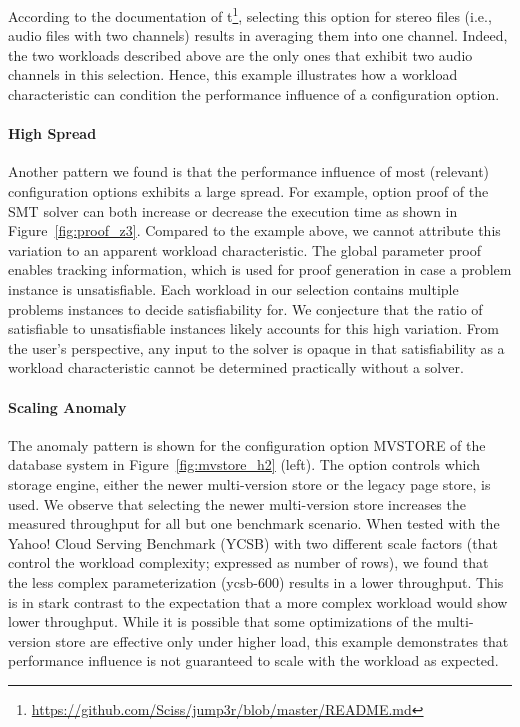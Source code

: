 {{{According to the documentation of t\jumper\footnote{\url{https://github.com/Sciss/jump3r/blob/master/README.md}}, selecting this option for stereo files (i.e., audio files with two channels) results in averaging them into one channel. Indeed, the two workloads described above are the only ones that exhibit two audio channels in this selection. Hence, this example illustrates how a workload  characteristic can condition the performance influence of a configuration option. 

\paragraph{High Spread} Another pattern we found is that the performance influence of most (relevant) configuration options exhibits a large spread. For example, option \textsf{proof} of the SMT solver \zdrei can both increase or decrease the execution time as shown in Figure~\ref{fig:proof_z3}. Compared to the example above, we cannot attribute this variation to an apparent workload characteristic.
The global parameter \textsf{proof} enables tracking information, which is used for proof generation in case a problem instance is unsatisfiable. Each workload in our selection contains multiple problems instances to decide satisfiability for. We conjecture that the ratio of satisfiable to unsatisfiable instances likely accounts for this high variation. From the user's perspective, any input to the solver is opaque in that satisfiability as a workload characteristic cannot be determined practically without a solver. 

\paragraph{Scaling Anomaly} The anomaly pattern is shown for the configuration option \textsf{MVSTORE} of the database system \htwo in Figure~\ref{fig:mvstore_h2} (left). The option controls which storage engine, either the newer multi-version store or the legacy page store, is used. We observe that selecting the newer multi-version store increases the measured throughput for all but one benchmark scenario. When tested with the Yahoo! Cloud Serving Benchmark (YCSB) with two different scale factors (that control the workload complexity; expressed as number of rows), we found that the less complex parameterization (ycsb-600) results in a lower throughput. This is in stark contrast to the expectation that a more complex workload would show lower throughput. While it is possible that some optimizations of the multi-version store are effective only under higher load, this example demonstrates that performance influence is not guaranteed to scale with the workload as expected. 

}}}
